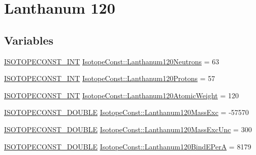 \hypertarget{group___isotope_const-_lanthanum-_la120}{}\section{Lanthanum 120}
\label{group___isotope_const-_lanthanum-_la120}
\subsection*{Variables}
\begin{DoxyCompactItemize}
\item 
\mbox{\hyperlink{group___isotope_const-_macros_ga5f18360b3e99483a35c32d789e62621c}{I\+S\+O\+T\+O\+P\+E\+C\+O\+N\+S\+T\+\_\+\+I\+NT}} \mbox{\hyperlink{group___isotope_const-_lanthanum-_la120_ga216724e044c7a109c4d73ad669821ddd}{Isotope\+Const\+::\+Lanthanum120\+Neutrons}} = 63
\item 
\mbox{\hyperlink{group___isotope_const-_macros_ga5f18360b3e99483a35c32d789e62621c}{I\+S\+O\+T\+O\+P\+E\+C\+O\+N\+S\+T\+\_\+\+I\+NT}} \mbox{\hyperlink{group___isotope_const-_lanthanum-_la120_gadca08345edfdad45345c709d9e4825e2}{Isotope\+Const\+::\+Lanthanum120\+Protons}} = 57
\item 
\mbox{\hyperlink{group___isotope_const-_macros_ga5f18360b3e99483a35c32d789e62621c}{I\+S\+O\+T\+O\+P\+E\+C\+O\+N\+S\+T\+\_\+\+I\+NT}} \mbox{\hyperlink{group___isotope_const-_lanthanum-_la120_ga5cd0cd9389b0616c98cf43fd4cc3af81}{Isotope\+Const\+::\+Lanthanum120\+Atomic\+Weight}} = 120
\item 
\mbox{\hyperlink{group___isotope_const-_macros_ga8f45a7272ce02c0b4c65c44636ed719a}{I\+S\+O\+T\+O\+P\+E\+C\+O\+N\+S\+T\+\_\+\+D\+O\+U\+B\+LE}} \mbox{\hyperlink{group___isotope_const-_lanthanum-_la120_gacd3351f9dabb895448e331afd789b6e5}{Isotope\+Const\+::\+Lanthanum120\+Mass\+Exc}} = -\/57570
\item 
\mbox{\hyperlink{group___isotope_const-_macros_ga8f45a7272ce02c0b4c65c44636ed719a}{I\+S\+O\+T\+O\+P\+E\+C\+O\+N\+S\+T\+\_\+\+D\+O\+U\+B\+LE}} \mbox{\hyperlink{group___isotope_const-_lanthanum-_la120_ga7b9a8678deead54430c5e8ed316ca982}{Isotope\+Const\+::\+Lanthanum120\+Mass\+Exc\+Unc}} = 300
\item 
\mbox{\hyperlink{group___isotope_const-_macros_ga8f45a7272ce02c0b4c65c44636ed719a}{I\+S\+O\+T\+O\+P\+E\+C\+O\+N\+S\+T\+\_\+\+D\+O\+U\+B\+LE}} \mbox{\hyperlink{group___isotope_const-_lanthanum-_la120_ga0605bc9f3d095463290956c5f8603b5c}{Isotope\+Const\+::\+Lanthanum120\+Bind\+E\+PerA}} = 8179
\item 

\end{DoxyCompactItemize}
